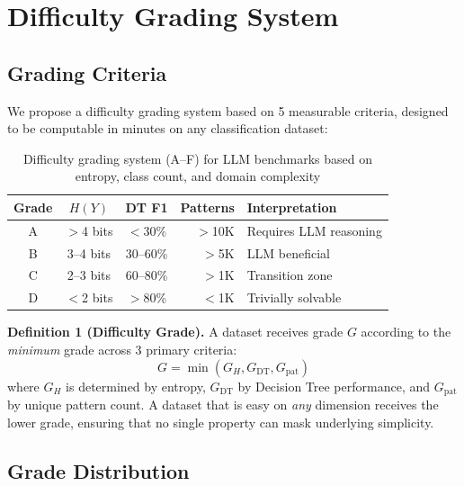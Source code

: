 \documentclass[journal]{IEEEtran}
\begin{document}
\section{Difficulty Grading System}

\subsection{Grading Criteria}
We propose a difficulty grading system based on 5 measurable criteria, designed to be computable in minutes on any classification dataset:

\begin{table}[!ht]
\centering
\caption{Difficulty grading system (A--F) for LLM benchmarks based on entropy, class count, and domain complexity}
\label{tab:grades}
\begin{tabular}{cccrl}
\toprule
\textbf{Grade} & \textbf{$H(Y)$} & \textbf{DT F1} & \textbf{Patterns} & \textbf{Interpretation} \\
\midrule
A & $>$4 bits & $<$30\% & $>$10K & Requires LLM reasoning \\
B & 3--4 bits & 30--60\% & $>$5K & LLM beneficial \\
C & 2--3 bits & 60--80\% & $>$1K & Transition zone \\
D & $<$2 bits & $>$80\% & $<$1K & Trivially solvable \\
\bottomrule
\end{tabular}
\end{table}

\noindent\textbf{Definition 1 (Difficulty Grade).} A dataset receives grade $G$ according to the \emph{minimum} grade across 3 primary criteria:
\begin{equation}
G = \min(G_{H}, G_{\text{DT}}, G_{\text{pat}})
\end{equation}
where $G_H$ is determined by entropy, $G_{\text{DT}}$ by Decision Tree performance, and $G_{\text{pat}}$ by unique pattern count. A dataset that is easy on \emph{any} dimension receives the lower grade, ensuring that no single property can mask underlying simplicity.

\subsection{Grade Distribution}
\end{document}
